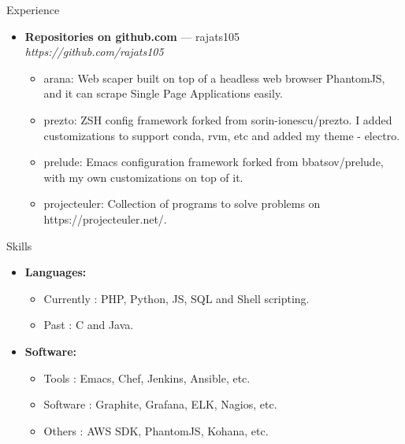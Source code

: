 \documentclass[a4paper,11pt,oneside]{article}
\newenvironment{ressection}[1]{
  \vspace{4pt}
         {\fontfamily{phv}\selectfont\Large#1}
         \begin{itemize}
           \vspace{3pt}
}{
         \end{itemize}
}
\newcommand{\resitem}[1]{
  \vspace{-4pt}
\item \begin{flushleft} #1 \end{flushleft}
}
\newcommand{\ressubitem}[1]{
  \vspace{-1pt}
\item \begin{flushleft} #1 \end{flushleft}
}
\newcommand{\resbigitem}[3]{
  \vspace{-5pt}
\item
  \textbf{#1} --- #2 \\
  \textit{#3}
}
\newenvironment{ressubsec}[3]{
  \resbigitem{#1}{#2}{#3}
  \vspace{-2pt}
  \begin{itemize}
}{
  \end{itemize}
}
\newenvironment{reslist}[1]{
  \resitem{\textbf{#1}}
  \vspace{-5pt}
  \begin{itemize}
}{
  \end{itemize}
}
\begin{document}
\begin{ressection}{Experience}
  \begin{ressubsec}{Repositories on github.com}{rajats105}{https://github.com/rajats105}
    \ressubitem{
      arana: Web scaper built on top of a headless web browser
      PhantomJS, and it can scrape Single Page Applications easily.
    }
    \ressubitem{
      prezto: ZSH config framework forked from sorin-ionescu/prezto.
      I added customizations to support conda, rvm, etc and added my
      theme - electro.
    }
    \ressubitem{
      prelude: Emacs configuration framework forked from
      bbatsov/prelude, with my own customizations on top of it.
    }
    \ressubitem{
      projecteuler: Collection of programs to solve problems on
      https://projecteuler.net/.
    }
  \end{ressubsec}
\end{ressection}


\begin{ressection}{Skills}
  \begin{reslist}{Languages:}
    \ressubitem{Currently : PHP, Python, JS, SQL and Shell scripting.}
    \ressubitem{Past : C and Java.}
  \end{reslist}
  \begin{reslist}{Software:}
    \ressubitem{Tools : Emacs, Chef, Jenkins, Ansible, etc.}
    \ressubitem{Software : Graphite, Grafana, ELK, Nagios, etc.}
    \ressubitem{Others : AWS SDK, PhantomJS, Kohana, etc.}
  \end{reslist}
\end{ressection}
\end{document}
